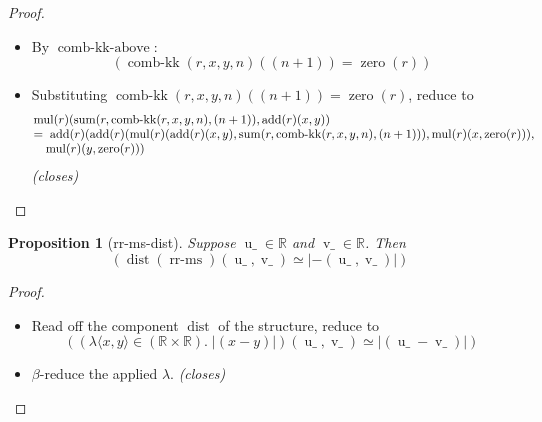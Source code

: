 \documentclass[11pt]{article}
\theoremstyle{plain}
\newtheorem{proposition}{Proposition}
\begin{document}
\begin{proof}
\begin{itemize}[leftmargin=2.8em, itemsep=4pt, parsep=1pt]
  \item[\textbf{40}] By $\operatorname{comb\text{-}kk\text{-}above}$:
\begin{equation*}
(\operatorname{comb\text{-}kk}(r, x, y, n)((n + 1)) = \operatorname{zero}(r))
\end{equation*}

  \item[\textbf{41--42}] Substituting $\operatorname{comb\text{-}kk}(r, x, y, n)((n + 1)) = \operatorname{zero}(r)$, reduce to
\begin{equation*}
\begin{array}{@{}l@{}} \operatorname{mul}(r)(\operatorname{sum}(r, \operatorname{comb\text{-}kk}(r, x, y, n), (n + 1)), \operatorname{add}(r)(x, y)) \\ =\; \operatorname{add}(r)(\operatorname{add}(r)(\operatorname{mul}(r)(\operatorname{add}(r)(x, y), \operatorname{sum}(r, \operatorname{comb\text{-}kk}(r, x, y, n), (n + 1))), \operatorname{mul}(r)(x, \operatorname{zero}(r))), \\ \quad \operatorname{mul}(r)(y, \operatorname{zero}(r))) \end{array}
\end{equation*}
  \emph{(closes)}
\end{itemize}
\end{proof}

\bigskip

\begin{proposition}[rr-ms-dist]
Suppose $\operatorname{u\_} \in \mathbb{R}$ and $\operatorname{v\_} \in \mathbb{R}$. Then
\begin{equation*}
(\operatorname{dist}(\operatorname{rr\text{-}ms})(\operatorname{u\_}, \operatorname{v\_}) \simeq \lvert -(\operatorname{u\_}, \operatorname{v\_}) \rvert)
\end{equation*}

\end{proposition}

\begin{proof}
\begin{itemize}[leftmargin=2.8em, itemsep=4pt, parsep=1pt]
  \item[\textbf{4}] Read off the component $\operatorname{dist}$ of the structure, reduce to
\begin{equation*}
((\lambda \langle x, y \rangle \in (\mathbb{R} \times \mathbb{R}).\; \lvert (x - y) \rvert)(\operatorname{u\_}, \operatorname{v\_}) \simeq \lvert (\operatorname{u\_} - \operatorname{v\_}) \rvert)
\end{equation*}

  \item[\textbf{5--6}] $\beta$-reduce the applied $\lambda$.  \emph{(closes)}
\end{itemize}
\end{proof}
\end{document}
